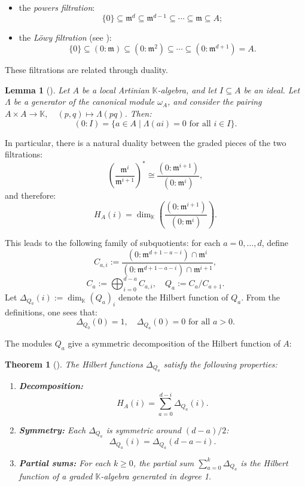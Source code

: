 \documentclass[a4paper,11p]{amsart}
\newtheorem{thm0}[defn0]{Theorem}
\newtheorem{lemma0}[defn0]{Lemma}
\newenvironment{theorem}{\bigskip \begin{thm0}}{\end{thm0}}
\newenvironment{lemma}{\bigskip \begin{lemma0}}{\end{lemma0}}
\newcommand{\K}{\mathbb K}
\begin{document}
\begin{itemize}
    \item the \emph{powers filtration}:
    \[
    \{0\} \subseteq \mathfrak{m}^d \subseteq \mathfrak{m}^{d-1} \subseteq \cdots \subseteq \mathfrak{m} \subseteq A;
    \]
    \item the \emph{Löwy filtration} (see \cite{Iarrobino}):
    \[
    \{0\} \subseteq (0 : \mathfrak{m}) \subseteq (0 : \mathfrak{m}^2) \subseteq \cdots \subseteq (0 : \mathfrak{m}^{d+1}) = A.
    \]
\end{itemize}

These filtrations are related through duality.

\begin{lemma}[{\cite[Lemma 2.31]{Joachim}}] 
    Let $A$ be a local Artinian $\K$-algebra, and let $I \subseteq A$ be an ideal. Let $\Lambda$ be a generator of the canonical module $\omega_A$, and consider the pairing
$    A \times A \to \K, \quad (p,q) \mapsto \Lambda(pq)$.
    Then:
    \[
    (0 : I) = \{ a \in A \mid \Lambda(ai) = 0 \text{ for all } i \in I \}.
    \]
\end{lemma}

In particular, there is a natural duality between the graded pieces of the two filtrations:
\[
\left(\frac{\mathfrak{m}^{i}}{\mathfrak{m}^{i+1}}\right)^* \cong \frac{(0 : \mathfrak{m}^{i+1})}{(0 : \mathfrak{m}^i)},
\]
and therefore:
\[
H_A(i) = \dim_\K \left( \frac{(0 : \mathfrak{m}^{i+1})}{(0 : \mathfrak{m}^i)} \right).
\]

This leads to the following family of subquotients: for each $a = 0, \ldots, d$, define
\[
C_{a,i} := \frac{(0 : \mathfrak{m}^{d+1 - a - i}) \cap \mathfrak{m}^i}{(0 : \mathfrak{m}^{d+1 - a - i}) \cap \mathfrak{m}^{i+1}},
\]
\[
C_a := \bigoplus_{i = 0}^{d - a} C_{a,i}, \quad Q_a := C_a / C_{a+1}.
\]
Let $\Delta_{Q_a}(i) := \dim_\K (Q_a)_i$ denote the Hilbert function of $Q_a$. From the definitions, one sees that:
\[
\Delta_{Q_0}(0) = 1, \quad \Delta_{Q_a}(0) = 0 \text{ for all } a > 0.
\]

The modules $Q_a$ give a symmetric decomposition of the Hilbert function of $A$:
\begin{theorem}[{\cite{Iarrobino}}]\label{thm:HF:decomposition}
    The Hilbert functions $\Delta_{Q_a}$ satisfy the following properties:
    \begin{enumerate}
        \item \textbf{Decomposition:}
        \[
        H_A(i) = \sum_{a = 0}^{d - i} \Delta_{Q_a}(i).
        \]
        
        \item \textbf{Symmetry:} Each $\Delta_{Q_a}$ is symmetric around $(d - a)/2$:
        \[
        \Delta_{Q_a}(i) = \Delta_{Q_a}(d - a - i).
        \]
        
        \item \label{HF: PartialSums} \textbf{Partial sums:} For each $k \geq 0$, the partial sum $\sum_{a = 0}^{k} \Delta_{Q_a}$ is the Hilbert function of a graded $\K$-algebra generated in degree 1.
    \end{enumerate}
\end{theorem}
\end{document}
